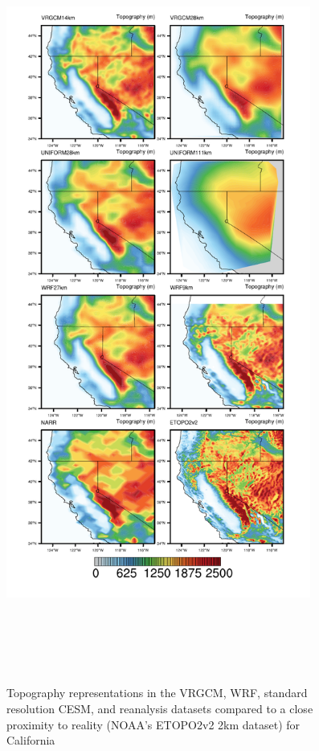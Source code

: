 \documentclass[11pt]{article}
\begin{document}
\begin{figure}
  \begin{center}
  \includegraphics[width=10cm,height=25cm,keepaspectratio]{Topography}
  \caption{\label{f3}  Topography representations in the VRGCM, WRF, standard resolution CESM, and reanalysis datasets compared to a close proximity to reality (NOAA's ETOPO2v2 2km dataset) for California}
  \end{center}
\end{figure}
\end{document}
